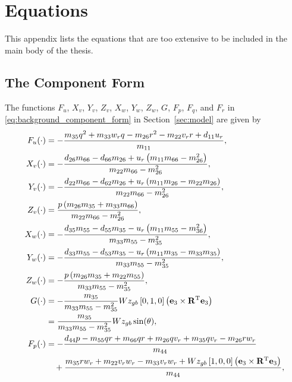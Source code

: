 \chapter{Equations}
This appendix lists the equations that are too extensive to be included in the main body of the thesis.
\allowdisplaybreaks

\section{The Component Form}
\label{app:component_form}
The functions $F_u$, $X_v$, $Y_v$, $Z_v$, $X_w$, $Y_w$, $Z_w$, $G$, $F_p$, $F_q$, and $F_r$ in \eqref{eq:background_component_form} in Section~\ref{sec:model} are given by
\begin{subequations}
    \begin{align}
        F_u(\cdot) &= -\frac{m_{35}q^2+m_{33}w_rq-m_{26}r^2-m_{22}v_rr+d_{11}u_r}{m_{11}}, \\
        X_v(\cdot) &= - \frac{d_{26}m_{66} - d_{66}m_{26} + u_r\left(m_{11}m_{66} - m_{26}^2\right)}{m_{22}m_{66} - m_{26}^2}, \\
        Y_v(\cdot) &= - \frac{d_{22}m_{66} - d_{62}m_{26} + u_r\left(m_{11}m_{26} - m_{22}m_{26}\right)}{m_{22}m_{66} - m_{26}^2}, \\
        Z_v(\cdot) &= \frac{p\left(m_{26}m_{35} + m_{33}m_{66}\right)}{m_{22}m_{66} - m_{26}^2}, \\
        X_w(\cdot) &= - \frac{d_{35}m_{55} - d_{55}m_{35} - u_r\left(m_{11}m_{55} - m_{36}^2\right)}{m_{33}m_{55} - m_{35}^2}, \\
        Y_w(\cdot) &= - \frac{d_{33}m_{55} - d_{53}m_{35} - u_r\left(m_{11}m_{35} - m_{33}m_{35}\right)}{m_{33}m_{55} - m_{35}^2}, \\
        Z_w(\cdot) &= - \frac{p\left(m_{26}m_{35} + m_{22}m_{55}\right)}{m_{33}m_{55} - m_{35}^2}, \\
        G(\cdot) &= -\frac{m_{35}}{m_{33}m_{55} - m_{35}^2} W z_{gb} \left[0, 1, 0\right] \left(\mat{e}_3 \times \mat{R}\T \mat{e}_3\right) \\
        &= \frac{m_{35}}{m_{33}m_{55} - m_{35}^2} W z_{gb} \sin(\theta) \nonumber, \\
        F_p(\cdot) &= -\frac{d_{44}p-m_{55}qr+m_{66}qr+m_{26}qv_r+m_{35}qv_r-m_{26}rw_r}{m_{44}} \\
        &\quad + \frac{m_{35}rw_r+m_{22}v_rw_r-m_{33}v_rw_r + W z_{gb} \left[1, 0, 0\right] \left(\mat{e}_3 \times \mat{R}\T \mat{e}_3\right)}{m_{44}}, \nonumber \\

\end{align}
\end{subequations}
